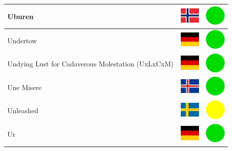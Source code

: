 \documentclass[12pt, a4paper, twoside]{report}
\begin{document}
\begin{center}
\begin{longtable}{|p{5cm}|p{2cm}|p{2cm}|}
 Uburen                                                     & \includegraphics[width=1cm]{4x3/no} &   \includegraphics[width=1cm]{likes/y} \\ \hline
 Undertow                                                   & \includegraphics[width=1cm]{4x3/de} &   \includegraphics[width=1cm]{likes/y} \\ \hline
 Undying Lust for Cadaverous Molestation (UxLxCxM)          & \includegraphics[width=1cm]{4x3/de} &   \includegraphics[width=1cm]{likes/y} \\ \hline
 Une Misere                                                 & \includegraphics[width=1cm]{4x3/is} &   \includegraphics[width=1cm]{likes/y} \\ \hline
 Unleashed                                                  & \includegraphics[width=1cm]{4x3/se} &   \includegraphics[width=1cm]{likes/m} \\ \hline
 Ur                                                         & \includegraphics[width=1cm]{4x3/de} &   \includegraphics[width=1cm]{likes/y} \\ \hline

\end{longtable}
\end{center}
\end{document}
